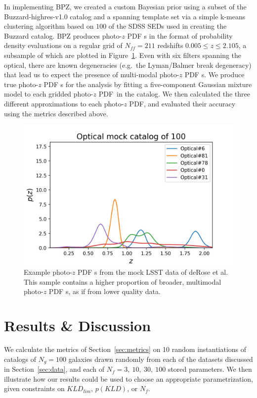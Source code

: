 \documentclass[\docopts]{\docclass}
\newcommand{\pz}{photo-$z$ PDF\xspace}
\begin{document}
In implementing BPZ, we created a custom Bayesian prior using a subset of the
Buzzard-highres-v1.0 catalog and a spanning template set via a simple k-means
clustering algorithm based on $100$ of the SDSS SEDs used in creating the
Buzzard catalog.  BPZ produces \pz s in the format of probability density
evaluations on a regular grid of $N_{ff}=211$ redshifts $0.005\leq z\leq2.105$,
a subsample of which are plotted in Figure~\ref{fig:lsst_pzs}.  Even with six
filters spanning the optical, there are known degeneracies (e.g.~the
Lyman/Balmer break degeneracy) that lead us to expect the presence of
multi-modal \pz s.  We produce true \pz s for the analysis by fitting a
five-component Gaussian mixture model to each gridded \pz\ in the catalog. We then calculated the three different approximations to each \pz, and evaluated their accuracy using the metrics described above.

\begin{figure}
  \includegraphics[width=0.9\columnwidth]{figures/lsst_pzs.png}
  \caption{Example \pz s from the mock LSST data of deRose et al. This sample contains a higher proportion of broader,
multimodal \pz s, as if from lower quality data.
  \label{fig:lsst_pzs}}
\end{figure}


\section{Results \& Discussion}
\label{sec:results}

We calculate the metrics of Section~\ref{sec:metrics} on 10 random
instantiations of catalogs of $N_{g}=100$ galaxies drawn randomly from each of the datasets discussed in
Section~\ref{sec:data}, and each of $N_{f}=3,\ 10,\ 30,\ 100$ stored parameters.
We then illustrate how our results
could be used to choose an appropriate parametrization, given constraints on
$KLD_{lim}$, $p(KLD)$, or $N_{f}$.
\end{document}
